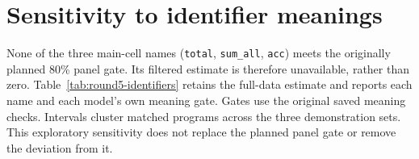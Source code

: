 \section{Sensitivity to identifier meanings}
\label{app:round5-identifiers}
None of the three main-cell names (\texttt{total}, \texttt{sum\_all}, \texttt{acc}) meets the originally planned 80\% panel gate. Its filtered estimate is therefore unavailable, rather than zero.
Table~\ref{tab:round5-identifiers} retains the full-data estimate and reports each name and each model's own meaning gate. Gates use the original saved meaning checks. Intervals cluster matched programs across the three demonstration sets. This exploratory sensitivity does not replace the planned panel gate or remove the deviation from it.
\begin{table}[t]
\centering\small
{}
\ifdim\wd\roundfivebox>\textwidth\resizebox{\textwidth}{!}{\usebox{\roundfivebox}}\else\usebox{\roundfivebox}\fi
\caption{Excess name errors in percentage points [95\% interval], level 5 length-to-sum. Empty subsets are shown as dashes. The saved JSON also reports each demonstration set and the all-three-sets sign rule.}
\label{tab:round5-identifiers}
\end{table}
